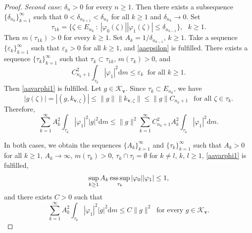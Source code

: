 \documentclass[a4paper,oneside,11pt]{amsart}
\numberwithin{equation}{section}
\theoremstyle{plain}
\theoremstyle{definition}
\begin{document}
\begin{proof}
\emph{Second case}: $\delta_n>0$ for every $n\geq 1$.   Then there exists a subsequence $\{\delta_{n_k}\}_{k=1}^\infty$ such that 
 $0<\delta_{n_{k+1}}<\delta_{n_k}$ for all $k\geq 1$ and $\delta_{n_k}\to 0$. 
Set $$\tau_{1k}=\{\zeta\in E_{n_k}\ : \ |\varphi_0(\zeta)||\varphi_1(\zeta)|\leq\delta_{n_{k-1}}\}, \ \ \ k\geq 1.$$
Then $m(\tau_{1k})>0$ for every $k\geq 1$. Set $A_k=1/\delta_{n_{k-1}}$, $k\geq 1$. 
 Take a sequence $\{\varepsilon_k\}_{k=1}^\infty$ such that 
$\varepsilon_k>0$ for all $k\geq 1$, and \eqref{aaepsilon} is fulfilled. 
There  exists a sequence $\{\tau_k\}_{k=1}^\infty$ such that $\tau_k\subset\tau_{1k}$, $m(\tau_k)>0$, 
and $$C_{n_k+1}^2\int_{\tau_k}|\varphi_1|^2{\mathrm d}m\leq\varepsilon_k \ \text{ for all }k\geq 1.$$
Then \eqref{aavarphi1}  is fulfilled. 
Let $g\in\mathcal K_{\mathbf v}$. Since $\tau_k\subset E_{n_k}$, we have
$$ |g(\zeta)|=|(g,k_{\mathbf v,\zeta})|\leq\|g\|\|k_{\mathbf v,\zeta}\|\leq\|g\|C_{n_k+1}
\ \ \text{ for all }\zeta\in\tau_k.$$
Therefore, 
$$  \sum_{k=1}^\infty A_k^2\int_{\tau_k}|\varphi_1|^2|g|^2{\mathrm d}m
\leq \|g\|^2\sum_{k=1}^\infty C_{n_k+1}^2 A_k^2\int_{\tau_k}|\varphi_1|^2{\mathrm d}m.$$

In both cases, we obtain the sequences  $\{A_k\}_{k=1}^\infty$ and $\{\tau_k\}_{k=1}^\infty$ such that $A_k>0$ for all $k\geq 1$, 
$A_k\to\infty$, $m(\tau_k)>0$, $\tau_k\cap\tau_l=\emptyset$ for $k\neq l$, $k$, $l\geq 1$, \eqref{aavarphi1}  is fulfilled,
\begin{equation}\label{aakdeltak} \sup_{k\geq 1}A_k\mathop{\text{\rm ess\,sup}}_{\tau_k}|\varphi_0||\varphi_1|\leq 1, 
\end{equation}
and there exists $C>0$ such that 
\begin{equation}\label{aavarphi1g} \sum_{k=1}^\infty A_k^2\int_{\tau_k}|\varphi_1|^2|g|^2{\mathrm d}m\leq C\|g\|^2
\ \text{ for every }  g\in\mathcal K_{\mathbf v}.
\end{equation}


\end{proof}
\end{document}
